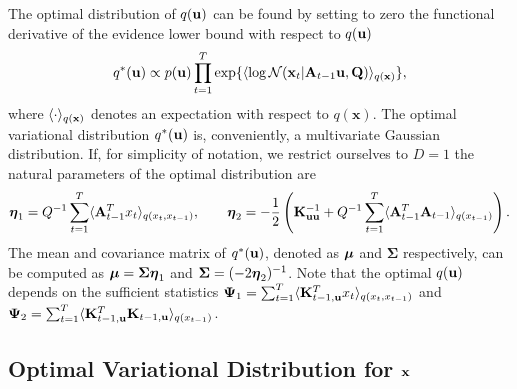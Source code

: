 \documentclass{article} %
\newcommand{\n}[1]{\mathbf{#1}}
\newcommand{\x}{\mathbf{x}}
\newcommand{\bSigma}{\boldsymbol\Sigma}
\begin{document}
The optimal distribution of $q({\bf u})$ can be found by setting to zero the functional derivative of the evidence lower bound with respect to $q({\bf u})$
\begin{equation}
q^{*}(\bu) \propto p(\bu) \prod_{t=1}^T \exp\{\langle \log \cN(\x_t |\n{A}_{t-1} \bu, \n{Q}) \rangle_{q(\bx)} \}, \label{eq:qstaru}
\end{equation}
where $\langle \cdot \rangle_{q({\bf x})}$ denotes an expectation with respect to $q(\x)$. The optimal variational distribution $q^{*}({\bf u})$ is, conveniently, a multivariate Gaussian distribution. If, for simplicity of notation, we restrict ourselves to $D=1$ the natural parameters of the optimal distribution are
\begin{equation}
	\boeta_1 = Q^{-1}\sum_{t=1}^T\langle \n{A}_{t-1}^T x_{t}\rangle_{q(x_t,x_{t-1})}, \qquad
\boeta_2 = -\ha \left( \bK_{\bu \bu}^{-1} + Q^{-1} \sum_{t=1}^T \langle\n{A}^T_{t-1} \n{A}_{t-1}\rangle_{q(x_{t-1})}  \right).  \label{eq:qstarunatural}
\end{equation}
The mean and covariance matrix of $q^*({\bf u})$, denoted as $\boldsymbol{\mu}$ and $\bSigma$ respectively, can be computed as $\bmu = \bSigma \boeta_1$ and $\bSigma = (-2\boeta_2)^{-1}$. Note that the optimal $q({\bf u})$ depends on the sufficient statistics $\boldsymbol\Psi_1=\sum_{t=1}^T \langle {\bf K}_{t-1,{\bf u}}^T x_t\rangle_{q(x_t,x_{t-1})}$ and $\boldsymbol\Psi_2=\sum_{t=1}^T \langle{\bf K}_{t-1,{\bf u}}^T {\bf K}_{t-1,{\bf u}}\rangle_{q(x_{t-1})}$. 




\subsection{Optimal Variational Distribution for ${\bf x}$}
\label{sec:optqx}
\end{document}
